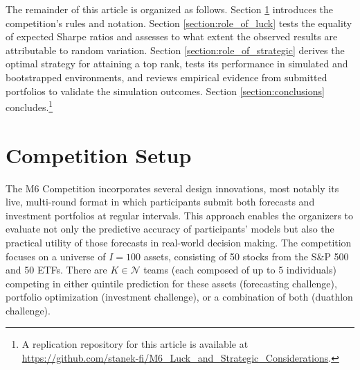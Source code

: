 \documentclass[3p,times,twocolumn]{elsarticle}
\begin{document}
The remainder of this article is organized as follows.
Section \ref{subsection:problem_setup} introduces the competition's rules and notation.
Section \ref{section:role_of_luck} tests the equality of expected Sharpe ratios and assesses to what extent the observed results are attributable to random variation.
Section \ref{section:role_of_strategic} derives the optimal strategy for attaining a top rank, tests its performance in simulated and bootstrapped environments, and reviews empirical evidence from submitted portfolios to validate the simulation outcomes.
Section \ref{section:conclusions} concludes.\footnote{
    A replication repository for this article is available at \url{https://github.com/stanek-fi/M6_Luck_and_Strategic_Considerations}. 
}

\section{Competition Setup}\label{subsection:problem_setup}

The M6 Competition incorporates several design innovations, most notably its live, multi-round format in which participants submit both forecasts and investment portfolios at regular intervals. 
This approach enables the organizers to evaluate not only the predictive accuracy of participants’ models but also the practical utility of those forecasts in real-world decision making.
The competition focuses on a universe of $I=100$ assets, consisting of 50 stocks from the S\&P 500 and 50 ETFs. 
There are $K\in \mathcal{N}$ teams (each composed of up to 5 individuals) competing in either quintile prediction for these assets (forecasting challenge), portfolio optimization (investment challenge), or a combination of both (duathlon challenge).
\end{document}
